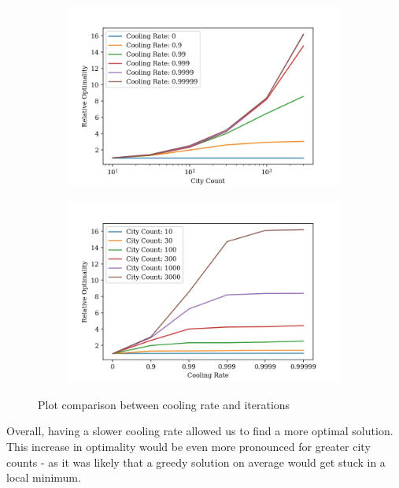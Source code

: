 \documentclass{article}
\begin{document}
\begin{figure}[H]
    \centering
    \begin{subfigure}{0.5\textwidth}
        \centering
        \includegraphics[width=1\linewidth]{images/rand_cooling_rate_city_count_distance_relative-to-base.jpg}
    \end{subfigure}%
    \begin{subfigure}{0.5\textwidth}
        \centering
        \includegraphics[width=1\linewidth]{images/rand_cooling_rate_city_count_distance_relative-to-base-transpose.jpg}
    \end{subfigure}
    \captionsetup{justification=centering}
    \caption{Plot comparison between cooling rate and iterations}
\end{figure}

Overall, having a slower cooling rate allowed us to find a more optimal solution.
This increase in optimality would be even more pronounced for greater city counts - as it was likely that a greedy solution on average would get stuck in a local minimum.
\\
\end{document}
